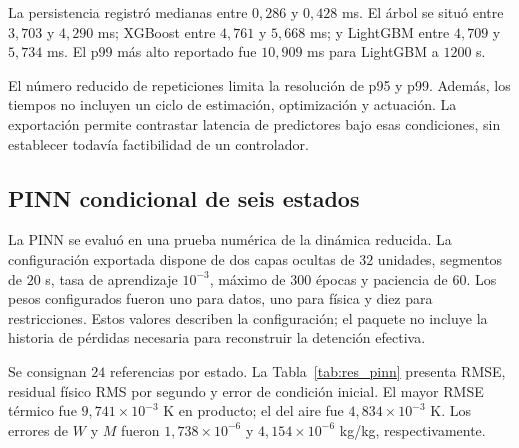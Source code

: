 La persistencia registró medianas entre $0{,}286$ y $0{,}428$ ms. El árbol se situó entre $3{,}703$ y $4{,}290$ ms; XGBoost entre $4{,}761$ y $5{,}668$ ms; y LightGBM entre $4{,}709$ y $5{,}734$ ms. El p99 más alto reportado fue $10{,}909$ ms para LightGBM a $1200$ s.

El número reducido de repeticiones limita la resolución de p95 y p99. Además, los tiempos no incluyen un ciclo de estimación, optimización y actuación. La exportación permite contrastar latencia de predictores bajo esas condiciones, sin establecer todavía factibilidad de un controlador.

\subsection{PINN condicional de seis estados}

La PINN se evaluó en una prueba numérica de la dinámica reducida. La configuración exportada dispone de dos capas ocultas de $32$ unidades, segmentos de $20$ s, tasa de aprendizaje $10^{-3}$, máximo de $300$ épocas y paciencia de $60$. Los pesos configurados fueron uno para datos, uno para física y diez para restricciones. Estos valores describen la configuración; el paquete no incluye la historia de pérdidas necesaria para reconstruir la detención efectiva.

Se consignan $24$ referencias por estado. La Tabla~\ref{tab:res_pinn} presenta RMSE, residual físico RMS por segundo y error de condición inicial. El mayor RMSE térmico fue $9{,}741\times10^{-3}$ K en producto; el del aire fue $4{,}834\times10^{-3}$ K. Los errores de $W$ y $M$ fueron $1{,}738\times10^{-6}$ y $4{,}154\times10^{-6}$ kg/kg, respectivamente.

